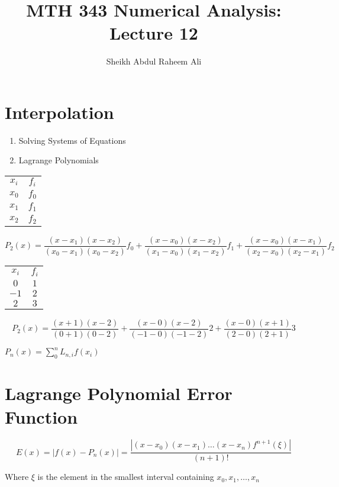 \documentclass[]{article}
\title{MTH 343 Numerical Analysis: Lecture 12}
\author{Sheikh Abdul Raheem Ali}
\begin{document}
\maketitle

\section*{Interpolation}

	\begin{enumerate}
		\item Solving Systems of Equations
		\item Lagrange Polynomials
	\end{enumerate}

\begin{tabular}{c c}
	$ x_i $ & $ f_i $ \\
	$ x_0 $ & $ f_0 $ \\
	$ x_1 $ & $ f_1 $ \\
	$ x_2 $ & $ f_2 $ 
\end{tabular}

\[ P_2(x) = \frac{(x-x_1)(x - x_2)}{(x_0 - x_1)(x_0 - x_2)}f_0 + \frac{(x-x_0)(x - x_2)}{(x_1 - x_0)(x_1 - x_2)}f_1 + \frac{(x-x_0)(x - x_1)}{(x_2 - x_0)(x_2 - x_1)}f_2 \]


\begin{tabular}{c c}
	$ x_i $ & $ f_i $ \\
	$ 0 $ & $ 1 $ \\
	$ -1 $ & $ 2 $ \\
	$ 2 $ & $ 3 $ 
\end{tabular}

\[  P_2(x) = \frac{(x+1)(x - 2)}{(0 + 1)(0 - 2)} + \frac{(x-0)(x - 2)}{(-1 - 0)(-1 - 2)}2 + \frac{(x-0)(x + 1)}{(2 - 0)(2 + 1)}3 \]

$ P_n(x) = \sum_{0}^{n}L_{n,i}f(x_i) $

\section*{Lagrange Polynomial Error Function}

\[ E(x) = |f(x) - P_n(x)| = \frac{|(x-x_0)(x-x_1)\dots(x-x_n)f^{n+1}(\xi)|}{(n+1)!}  \]

Where $ \xi  $ is the element in the smallest interval containing $ x_0,x_1,\dots,x_n $
\end{document}
